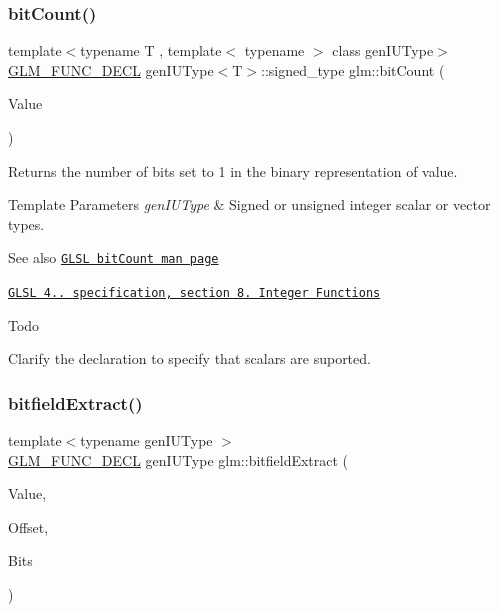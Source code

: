 \subsubsection{\texorpdfstring{bit\+Count()}{bitCount()}}
{\footnotesize\ttfamily template$<$typename T , template$<$ typename $>$ class gen\+I\+U\+Type$>$ \\
\hyperlink{setup_8hpp_ab2d052de21a70539923e9bcbf6e83a51}{G\+L\+M\+\_\+\+F\+U\+N\+C\+\_\+\+D\+E\+CL} gen\+I\+U\+Type$<$T$>$\+::signed\+\_\+type glm\+::bit\+Count (\begin{DoxyParamCaption}\item[{gen\+I\+U\+Type$<$ T $>$ const \&}]{Value }\end{DoxyParamCaption})}

Returns the number of bits set to 1 in the binary representation of value.


\begin{DoxyTemplParams}{Template Parameters}
{\em gen\+I\+U\+Type} & Signed or unsigned integer scalar or vector types.\\
\hline
\end{DoxyTemplParams}
\begin{DoxySeeAlso}{See also}
\href{http://www.opengl.org/sdk/docs/manglsl/xhtml/bitCount.xml}{\tt G\+L\+SL bit\+Count man page} 

\href{http://www.opengl.org/registry/doc/GLSLangSpec.4.20.8.pdf}{\tt G\+L\+SL 4.. specification, section 8. Integer Functions}
\end{DoxySeeAlso}
\begin{DoxyRefDesc}{Todo}
\item[\hyperlink{todo__todo000001}{Todo}]Clarify the declaration to specify that scalars are suported. \end{DoxyRefDesc}
\mbox{\label{group__core__func__integer_ga251d309beb171bf95117d2c301b2ad8b}} 
\subsubsection{\texorpdfstring{bitfield\+Extract()}{bitfieldExtract()}}
{\footnotesize\ttfamily template$<$typename gen\+I\+U\+Type $>$ \\
\hyperlink{setup_8hpp_ab2d052de21a70539923e9bcbf6e83a51}{G\+L\+M\+\_\+\+F\+U\+N\+C\+\_\+\+D\+E\+CL} gen\+I\+U\+Type glm\+::bitfield\+Extract (\begin{DoxyParamCaption}\item[{gen\+I\+U\+Type const \&}]{Value,  }\item[{int const \&}]{Offset,  }\item[{int const \&}]{Bits }\end{DoxyParamCaption})}

